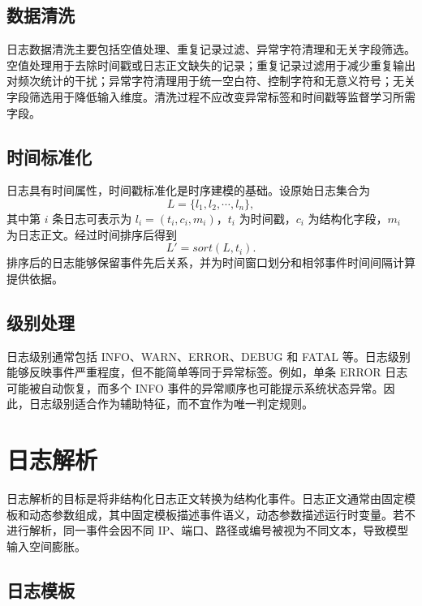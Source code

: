\subsection{数据清洗}

日志数据清洗主要包括空值处理、重复记录过滤、异常字符清理和无关字段筛选。空值处理用于去除时间戳或日志正文缺失的记录；重复记录过滤用于减少重复输出对频次统计的干扰；异常字符清理用于统一空白符、控制字符和无意义符号；无关字段筛选用于降低输入维度。清洗过程不应改变异常标签和时间戳等监督学习所需字段。

\subsection{时间标准化}

日志具有时间属性，时间戳标准化是时序建模的基础。设原始日志集合为
\begin{equation}
    L=\{l_1,l_2,\cdots,l_n\},
\end{equation}
其中第 $i$ 条日志可表示为 $l_i=(t_i,c_i,m_i)$，$t_i$ 为时间戳，$c_i$ 为结构化字段，$m_i$ 为日志正文。经过时间排序后得到
\begin{equation}
    L'=sort(L,t_i).
\end{equation}
排序后的日志能够保留事件先后关系，并为时间窗口划分和相邻事件时间间隔计算提供依据。

\subsection{级别处理}

日志级别通常包括 INFO、WARN、ERROR、DEBUG 和 FATAL 等。日志级别能够反映事件严重程度，但不能简单等同于异常标签。例如，单条 ERROR 日志可能被自动恢复，而多个 INFO 事件的异常顺序也可能提示系统状态异常。因此，日志级别适合作为辅助特征，而不宜作为唯一判定规则。

\section{日志解析}

日志解析的目标是将非结构化日志正文转换为结构化事件。日志正文通常由固定模板和动态参数组成，其中固定模板描述事件语义，动态参数描述运行时变量。若不进行解析，同一事件会因不同 IP、端口、路径或编号被视为不同文本，导致模型输入空间膨胀。

\subsection{日志模板}

